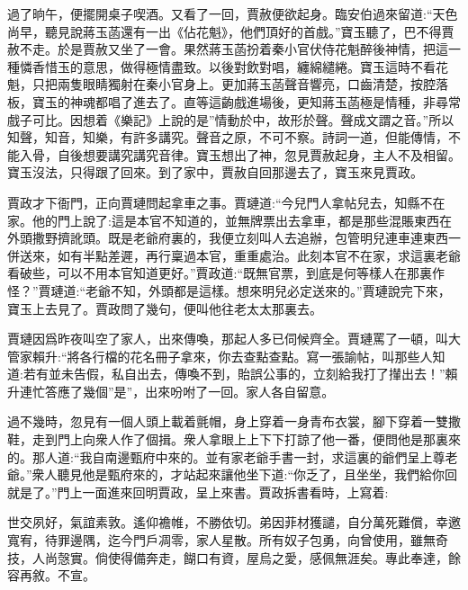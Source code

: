 \begin{parag}
    過了晌午，便擺開桌子喫酒。又看了一回，賈赦便欲起身。臨安伯過來留道:“天色尚早，聽見說蔣玉菡還有一出《佔花魁》，他們頂好的首戲。”寶玉聽了，巴不得賈赦不走。於是賈赦又坐了一會。果然蔣玉菡扮着秦小官伏侍花魁醉後神情，把這一種憐香惜玉的意思，做得極情盡致。以後對飲對唱，纏綿繾綣。寶玉這時不看花魁，只把兩隻眼睛獨射在秦小官身上。更加蔣玉菡聲音響亮，口齒清楚，按腔落板，寶玉的神魂都唱了進去了。直等這齣戲進場後，更知蔣玉菡極是情種，非尋常戲子可比。因想着《樂記》上說的是”情動於中，故形於聲。聲成文謂之音。”所以知聲，知音，知樂，有許多講究。聲音之原，不可不察。詩詞一道，但能傳情，不能入骨，自後想要講究講究音律。寶玉想出了神，忽見賈赦起身，主人不及相留。寶玉沒法，只得跟了回來。到了家中，賈赦自回那邊去了，寶玉來見賈政。
\end{parag}


\begin{parag}
    賈政才下衙門，正向賈璉問起拿車之事。賈璉道:“今兒門人拿帖兒去，知縣不在家。他的門上說了:這是本官不知道的，並無牌票出去拿車，都是那些混賬東西在外頭撒野擠訛頭。既是老爺府裏的，我便立刻叫人去追辦，包管明兒連車連東西一併送來，如有半點差遲，再行稟過本官，重重處治。此刻本官不在家，求這裏老爺看破些，可以不用本官知道更好。”賈政道:“既無官票，到底是何等樣人在那裏作怪？”賈璉道:“老爺不知，外頭都是這樣。想來明兒必定送來的。”賈璉說完下來，寶玉上去見了。賈政問了幾句，便叫他往老太太那裏去。
\end{parag}


\begin{parag}
    賈璉因爲昨夜叫空了家人，出來傳喚，那起人多已伺候齊全。賈璉罵了一頓，叫大管家賴升:“將各行檔的花名冊子拿來，你去查點查點。寫一張諭帖，叫那些人知道:若有並未告假，私自出去，傳喚不到，貽誤公事的，立刻給我打了攆出去！”賴升連忙答應了幾個”是”，出來吩咐了一回。家人各自留意。
\end{parag}


\begin{parag}
    過不幾時，忽見有一個人頭上載着氈帽，身上穿着一身青布衣裳，腳下穿着一雙撒鞋，走到門上向衆人作了個揖。衆人拿眼上上下下打諒了他一番，便問他是那裏來的。那人道:“我自南邊甄府中來的。並有家老爺手書一封，求這裏的爺們呈上尊老爺。”衆人聽見他是甄府來的，才站起來讓他坐下道:“你乏了，且坐坐，我們給你回就是了。”門上一面進來回明賈政，呈上來書。賈政拆書看時，上寫着:
\end{parag}


\begin{qute2sp}
    世交夙好，氣誼素敦。遙仰襜帷，不勝依切。弟因菲材獲譴，自分萬死難償，幸邀寬宥，待罪邊隅，迄今門戶凋零，家人星散。所有奴子包勇，向曾使用，雖無奇技，人尚愨實。倘使得備奔走，餬口有資，屋烏之愛，感佩無涯矣。專此奉達，餘容再敘。不宣。
\end{qute2sp}


